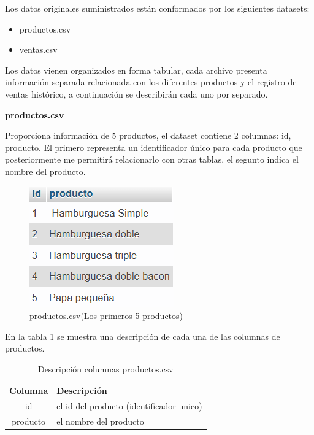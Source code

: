 Los datos originales suministrados están conformados por los siguientes datasets: 
\begin{itemize}
  \item productos.csv 
  \item ventas.csv
\end{itemize}

Los datos vienen organizados en forma tabular, cada archivo presenta información separada relacionada con los diferentes productos y el registro de ventas histórico, a continuación se describirán cada uno por separado.

\vspace{1\baselineskip}
\textbf{productos.csv}

Proporciona información de 5  productos, el dataset contiene 2 columnas: id, producto. El primero representa un identificador único para cada producto que posteriormente me permitirá relacionarlo con otras tablas, el segunto indica el nombre del producto.

\begin{figure}[H]
  \begin{center}
    \includegraphics[scale=0.90]{./primeros_5productos.png}
    \caption{productos.csv(Los primeros 5 productos)}
    \label{fig:priemeros_5productos}
  \end{center}
\end{figure}

En la tabla \ref{tab:productos} se muestra una descripción de cada una de las columnas de productos.

\begin{table}[H]

  \begin{tabular}{|c|l|}  %
    \hline
    \rowcolor{gray!50} \textbf{Columna} & \textbf{Descripción} \\
    \hline
    id &  el id del producto (identificador unico)\\
    producto & el nombre del producto \\
    \hline
  \end{tabular}
  \centering
  \caption{ Descripción columnas productos.csv}
  \label{tab:productos} %
\end{table}


